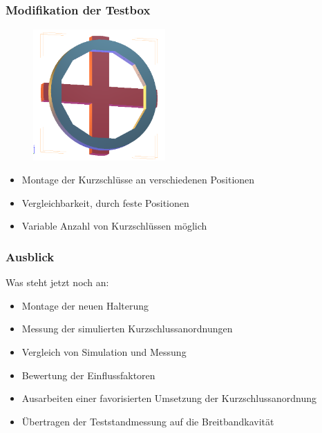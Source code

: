 \documentclass[accentcolor=tud9b, colorbacktitle, inverttitle]{tudbeamer}
\begin{document}
\begin{frame}\frametitle{Modifikation der Testbox}
\begin{multicols}{2}
\vspace{-2em}
	\begin{figure}[h]
		\centering
		\includegraphics[width=0.45\textwidth]{halterung}
	\end{figure}
	\vfill\null
	\columnbreak
	\begin{itemize}
		\item Montage der Kurzschl\"usse an verschiedenen Positionen 
		\item Vergleichbarkeit, durch feste Positionen
		\item Variable Anzahl von Kurzschl\"ussen m\"oglich
	\end{itemize}

\end{multicols}
\end{frame}


\begin{frame}\frametitle{Ausblick}
Was steht jetzt noch an:
        \begin{itemize}
            \item Montage der neuen Halterung
            \item Messung der simulierten Kurzschlussanordnungen
            \item Vergleich von Simulation und Messung
            \item Bewertung der Einflussfaktoren
            \item Ausarbeiten einer favorisierten Umsetzung der Kurzschlussanordnung
            \item Übertragen der Teststandmessung auf die Breitbandkavität
            
        \end{itemize}

\end{frame}

% 	 
\end{document}
